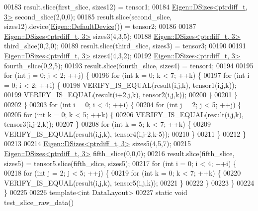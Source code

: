 \begin{DoxyCode}
00183   result.slice(first\_slice, sizes12) = tensor1;
00184   \hyperlink{struct_eigen_1_1_d_sizes}{Eigen::DSizes<ptrdiff\_t, 3>} second\_slice(2,0,0);
00185   result.slice(second\_slice, sizes12).device(\hyperlink{struct_eigen_1_1_default_device}{Eigen::DefaultDevice}()) = tensor2;
00186 
00187   \hyperlink{struct_eigen_1_1_d_sizes}{Eigen::DSizes<ptrdiff\_t, 3>} sizes3(4,3,5);
00188   \hyperlink{struct_eigen_1_1_d_sizes}{Eigen::DSizes<ptrdiff\_t, 3>} third\_slice(0,2,0);
00189   result.slice(third\_slice, sizes3) = tensor3;
00190 
00191   \hyperlink{struct_eigen_1_1_d_sizes}{Eigen::DSizes<ptrdiff\_t, 3>} sizes4(4,3,2);
00192   \hyperlink{struct_eigen_1_1_d_sizes}{Eigen::DSizes<ptrdiff\_t, 3>} fourth\_slice(0,2,5);
00193   result.slice(fourth\_slice, sizes4) = tensor4;
00194 
00195   \textcolor{keywordflow}{for} (\textcolor{keywordtype}{int} j = 0; j < 2; ++j) \{
00196     \textcolor{keywordflow}{for} (\textcolor{keywordtype}{int} k = 0; k < 7; ++k) \{
00197       \textcolor{keywordflow}{for} (\textcolor{keywordtype}{int} i = 0; i < 2; ++i) \{
00198         VERIFY\_IS\_EQUAL(result(i,j,k), tensor1(i,j,k));
00199         VERIFY\_IS\_EQUAL(result(i+2,j,k), tensor2(i,j,k));
00200       \}
00201     \}
00202   \}
00203   \textcolor{keywordflow}{for} (\textcolor{keywordtype}{int} i = 0; i < 4; ++i) \{
00204     \textcolor{keywordflow}{for} (\textcolor{keywordtype}{int} j = 2; j < 5; ++j) \{
00205       \textcolor{keywordflow}{for} (\textcolor{keywordtype}{int} k = 0; k < 5; ++k) \{
00206         VERIFY\_IS\_EQUAL(result(i,j,k), tensor3(i,j-2,k));
00207       \}
00208       \textcolor{keywordflow}{for} (\textcolor{keywordtype}{int} k = 5; k < 7; ++k) \{
00209         VERIFY\_IS\_EQUAL(result(i,j,k), tensor4(i,j-2,k-5));
00210       \}
00211     \}
00212   \}
00213 
00214   \hyperlink{struct_eigen_1_1_d_sizes}{Eigen::DSizes<ptrdiff\_t, 3>} sizes5(4,5,7);
00215   \hyperlink{struct_eigen_1_1_d_sizes}{Eigen::DSizes<ptrdiff\_t, 3>} fifth\_slice(0,0,0);
00216   result.slice(fifth\_slice, sizes5) = tensor5.slice(fifth\_slice, sizes5);
00217   \textcolor{keywordflow}{for} (\textcolor{keywordtype}{int} i = 0; i < 4; ++i) \{
00218     \textcolor{keywordflow}{for} (\textcolor{keywordtype}{int} j = 2; j < 5; ++j) \{
00219       \textcolor{keywordflow}{for} (\textcolor{keywordtype}{int} k = 0; k < 7; ++k) \{
00220         VERIFY\_IS\_EQUAL(result(i,j,k), tensor5(i,j,k));
00221       \}
00222     \}
00223   \}
00224 \}
00225 
00226 \textcolor{keyword}{template}<\textcolor{keywordtype}{int} DataLayout>
00227 \textcolor{keyword}{static} \textcolor{keywordtype}{void} test\_slice\_raw\_data()

\end{DoxyCode}
